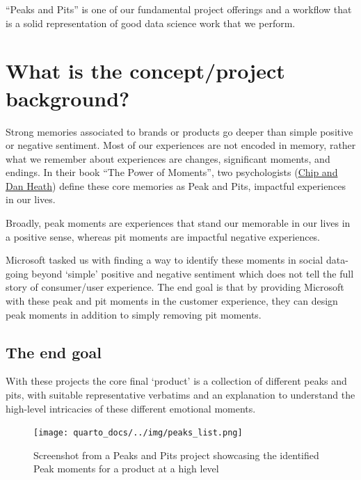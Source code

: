 \documentclass[
  letterpaper,
  DIV=11,
  numbers=noendperiod]{scrreprt}
\begin{document}
``Peaks and Pits'' is one of our fundamental project offerings and a
workflow that is a solid representation of good data science work that
we perform.

\section{What is the concept/project
background?}\label{what-is-the-conceptproject-background}

Strong memories associated to brands or products go deeper than simple
positive or negative sentiment. Most of our experiences are not encoded
in memory, rather what we remember about experiences are changes,
significant moments, and endings. In their book ``The Power of
Moments'', two psychologists
(\href{https://heathbrothers.com/about/}{Chip and Dan Heath}) define
these core memories as Peak and Pits, impactful experiences in our
lives.

Broadly, peak moments are experiences that stand our memorable in our
lives in a positive sense, whereas pit moments are impactful negative
experiences.

Microsoft tasked us with finding a way to identify these moments in
social data- going beyond `simple' positive and negative sentiment which
does not tell the full story of consumer/user experience. The end goal
is that by providing Microsoft with these peak and pit moments in the
customer experience, they can design peak moments in addition to simply
removing pit moments.

\subsection{The end goal}\label{the-end-goal}

With these projects the core final `product' is a collection of
different peaks and pits, with suitable representative verbatims and an
explanation to understand the high-level intricacies of these different
emotional moments.

\begin{figure}[H]

{\centering \texttt{[image: quarto\_docs/../img/peaks\_list.png]}

}

\caption{Screenshot from a Peaks and Pits project showcasing the
identified Peak moments for a product at a high level}

\end{figure}%
\end{document}
